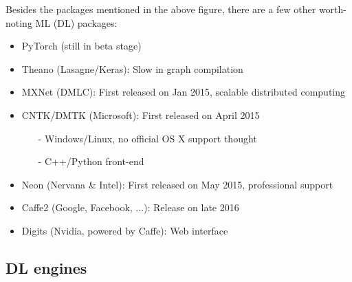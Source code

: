 \documentclass[11pt, oneside]{article}   	%
\begin{document}
Besides the packages mentioned in the above figure, there are a few {other worth-noting ML (DL) packages:}
\begin{itemize}\setlength\itemsep{0.25em}
	\item PyTorch (still in {beta} stage)
	\item Theano (Lasagne/Keras): Slow in graph compilation
	\item MXNet (DMLC): First released on Jan 2015, scalable distributed computing
	\item CNTK/DMTK (Microsoft): First released on April 2015
		\begin{itemize}
		\item[-] Windows/Linux, no official OS X support thought
		\item[-] C++/Python front-end
		\end{itemize}
	\item Neon (Nervana \& Intel): First released on May 2015, professional support
	\item Caffe2 (Google, Facebook, ...): Release on late 2016
	\item Digits (Nvidia, powered by Caffe): Web interface
\end{itemize}

\subsection{DL engines}
\end{document}
